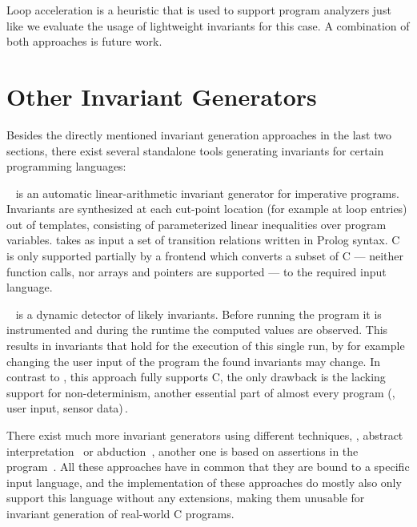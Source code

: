 Loop acceleration is a heuristic that is used to support program analyzers just like we
evaluate the usage of lightweight invariants for this case. A combination of both
approaches is future work.

\section{Other Invariant Generators}\label{related:other}
Besides the directly mentioned invariant generation approaches in the last two sections,
there exist several standalone tools generating invariants for certain programming
languages:

\InvGen{}~\cite{Gupta:InvGen} is an automatic linear-arithmetic invariant generator for
imperative programs. Invariants are synthesized at each cut-point location (for example at loop
entries) out of templates, consisting of parameterized linear inequalities over program
variables. \InvGen{} takes as input a set of transition relations written in Prolog
syntax. C is only supported partially by a frontend which converts a subset of C ---
neither function calls, nor arrays and pointers are supported --- to the required input
language.

\Daikon{}~\cite{Ernst:Daikon} is a dynamic detector of likely invariants. Before running
the program it is instrumented and during the runtime the computed values are observed.
This results in invariants that hold for the execution of this single run, by for example
changing the user input of the program the found invariants may change. In contrast to
\InvGen{}, this approach fully supports C, the only drawback is the lacking support for
non-determinism, another essential part of almost every program (\eg, user input, sensor
data)\,.
 

There exist much more invariant generators using different techniques, \eg, abstract
interpretation~\cite{Lahiri:invAbstractInt} or abduction~\cite{Dillig:abduction}, another
one is based on assertions in the program~\cite{Janota:assertion}. All these approaches
have in common that they are bound to a specific input language, and the implementation of
these approaches do mostly also only support this language without any extensions, making
them unusable for invariant generation of real-world C programs.

